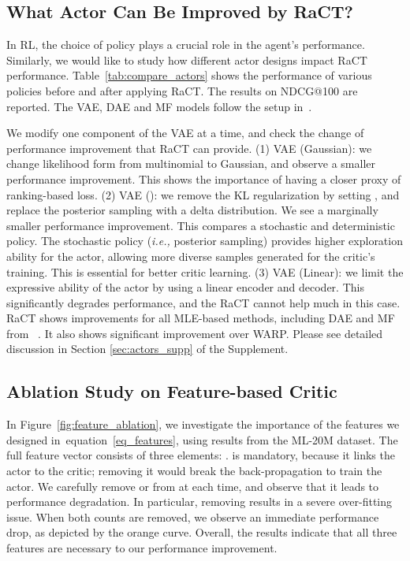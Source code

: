 \documentclass{article} \usepackage{iclr2020_conference,times}
\def\eqref#1{equation~\ref{#1}}
\newcommand{\ie}[0]{\emph{i.e., }}
\begin{document}
\subsection{What Actor Can Be Improved by RaCT?}
In RL, the choice of policy plays a crucial role in the agent's performance. Similarly, we would like to study how different actor designs impact RaCT performance. Table~\ref{tab:compare_actors} shows the performance of various policies before and after applying RaCT. The results on NDCG@100 are reported. The VAE, DAE and MF models follow the setup in~\citet{liang2018variational}.


We modify one component of the VAE at a time, and check the change of performance improvement that RaCT can provide. 
(1) VAE (Gaussian): we change likelihood form from multinomial to Gaussian, and observe a smaller performance improvement. This shows the importance of having a closer proxy of ranking-based loss.
(2) VAE (): we remove the KL regularization by setting , and replace the posterior sampling with a delta distribution. We see a marginally smaller performance improvement. This compares a stochastic and deterministic policy.  The stochastic policy (\ie posterior sampling) provides higher exploration ability for the actor, allowing more diverse samples generated for the critic's training. This is essential for better critic learning. 
(3) VAE (Linear): we limit the expressive ability of the actor by using a linear encoder and decoder. This significantly degrades performance, and the RaCT cannot help much in this case. RaCT shows improvements for all MLE-based methods, including DAE and MF from ~\citet{liang2018variational}. It also shows significant improvement over WARP. 
Please see detailed discussion in Section \ref{sec:actors_supp} of the Supplement.
\subsection{Ablation Study on Feature-based Critic} 
In Figure~\ref{fig:feature_ablation}, we investigate the importance of the features we designed in~\eqref{eq_features}, using results from the ML-20M dataset.
The full feature vector consists of three elements: 
. 
 is mandatory, because it links the actor to the critic; removing it would break the back-propagation to train the actor. 
We carefully remove 
 or  from  at each time, and observe that it leads to performance degradation. In particular, removing  results in a severe over-fitting issue. 
When both counts are removed, we observe an immediate performance drop, as depicted by the orange curve. Overall, the results indicate that all three features are necessary to our performance improvement.
\end{document}
